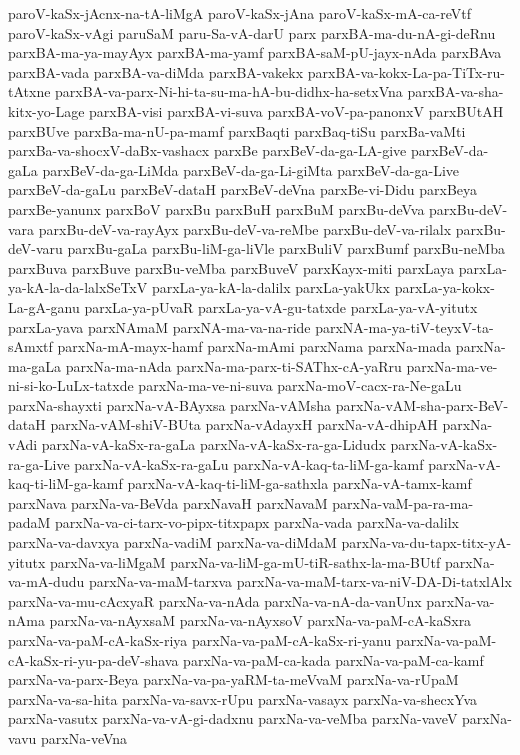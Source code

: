 {paroV-kaSx-jAcnx-na-tA-liMgA
paroV-kaSx-jAna
paroV-kaSx-mA-ca-reVtf
paroV-kaSx-vAgi
paruSaM
paru-Sa-vA-darU
parx
parxBA-ma-du-nA-gi-deRnu
parxBA-ma-ya-mayAyx
parxBA-ma-yamf
parxBA-saM-pU-jayx-nAda
parxBAva
parxBA-vada
parxBA-va-diMda
parxBA-vakekx
parxBA-va-kokx-La-pa-TiTx-ru-tAtxne
parxBA-va-parx-Ni-hi-ta-su-ma-hA-bu-didhx-ha-setxVna
parxBA-va-sha-kitx-yo-Lage
parxBA-visi
parxBA-vi-suva
parxBA-voV-pa-panonxV
parxBUtAH
parxBUve
parxBa-ma-nU-pa-mamf
parxBaqti
parxBaq-tiSu
parxBa-vaMti
parxBa-va-shocxV-daBx-vashacx
parxBe
parxBeV-da-ga-LA-give
parxBeV-da-gaLa
parxBeV-da-ga-LiMda
parxBeV-da-ga-Li-giMta
parxBeV-da-ga-Live
parxBeV-da-gaLu
parxBeV-dataH
parxBeV-deVna
parxBe-vi-Didu
parxBeya
parxBe-yanunx
parxBoV
parxBu
parxBuH
parxBuM
parxBu-deVva
parxBu-deV-vara
parxBu-deV-va-rayAyx
parxBu-deV-va-reMbe
parxBu-deV-va-rilalx
parxBu-deV-varu
parxBu-gaLa
parxBu-liM-ga-liVle
parxBuliV
parxBumf
parxBu-neMba
parxBuva
parxBuve
parxBu-veMba
parxBuveV
parxKayx-miti
parxLaya
parxLa-ya-kA-la-da-lalxSeTxV
parxLa-ya-kA-la-dalilx
parxLa-yakUkx
parxLa-ya-kokx-La-gA-ganu
parxLa-ya-pUvaR
parxLa-ya-vA-gu-tatxde
parxLa-ya-vA-yitutx
parxLa-yava
parxNAmaM
parxNA-ma-va-na-ride
parxNA-ma-ya-tiV-teyxV-ta-sAmxtf
parxNa-mA-mayx-hamf
parxNa-mAmi
parxNama
parxNa-mada
parxNa-ma-gaLa
parxNa-ma-nAda
parxNa-ma-parx-ti-SAThx-cA-yaRru
parxNa-ma-ve-ni-si-ko-LuLx-tatxde
parxNa-ma-ve-ni-suva
parxNa-moV-cacx-ra-Ne-gaLu
parxNa-shayxti
parxNa-vA-BAyxsa
parxNa-vAMsha
parxNa-vAM-sha-parx-BeV-dataH
parxNa-vAM-shiV-BUta
parxNa-vAdayxH
parxNa-vA-dhipAH
parxNa-vAdi
parxNa-vA-kaSx-ra-gaLa
parxNa-vA-kaSx-ra-ga-Lidudx
parxNa-vA-kaSx-ra-ga-Live
parxNa-vA-kaSx-ra-gaLu
parxNa-vA-kaq-ta-liM-ga-kamf
parxNa-vA-kaq-ti-liM-ga-kamf
parxNa-vA-kaq-ti-liM-ga-sathxla
parxNa-vA-tamx-kamf
parxNava
parxNa-va-BeVda
parxNavaH
parxNavaM
parxNa-vaM-pa-ra-ma-padaM
parxNa-va-ci-tarx-vo-pipx-titxpapx
parxNa-vada
parxNa-va-dalilx
parxNa-va-davxya
parxNa-vadiM
parxNa-va-diMdaM
parxNa-va-du-tapx-titx-yA-yitutx
parxNa-va-liMgaM
parxNa-va-liM-ga-mU-tiR-sathx-la-ma-BUtf
parxNa-va-mA-dudu
parxNa-va-maM-tarxva
parxNa-va-maM-tarx-va-niV-DA-Di-tatxlAlx
parxNa-va-mu-cAcxyaR
parxNa-va-nAda
parxNa-va-nA-da-vanUnx
parxNa-va-nAma
parxNa-va-nAyxsaM
parxNa-va-nAyxsoV
parxNa-va-paM-cA-kaSxra
parxNa-va-paM-cA-kaSx-riya
parxNa-va-paM-cA-kaSx-ri-yanu
parxNa-va-paM-cA-kaSx-ri-yu-pa-deV-shava
parxNa-va-paM-ca-kada
parxNa-va-paM-ca-kamf
parxNa-va-parx-Beya
parxNa-va-pa-yaRM-ta-meVvaM
parxNa-va-rUpaM
parxNa-va-sa-hita
parxNa-va-savx-rUpu
parxNa-vasayx
parxNa-va-shecxYva
parxNa-vasutx
parxNa-va-vA-gi-dadxnu
parxNa-va-veMba
parxNa-vaveV
parxNa-vavu
parxNa-veVna
}

